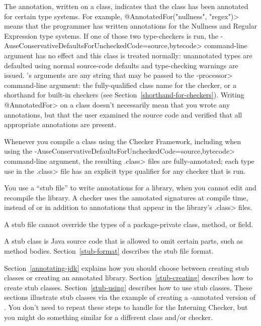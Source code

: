 The  annotation, written on a
class, indicates that the class has been annotated for certain type
systems.  For example, \<@AnnotatedFor(\ttlcb"nullness", "regex"\ttrcb)> means that
the programmer has written annotations for the Nullness and Regular
Expression type systems.  If one of those two type-checkers is run,
the \<-AuseConservativeDefaultsForUncheckedCode=source,bytecode> command-line argument
has no effect and this class is treated normally:
unannotated types are defaulted using normal source-code
defaults and type-checking warnings are issued.
's arguments are any string that
may be passed to the \<-processor> command-line argument:  the
fully-qualified class name for the checker, or a shorthand for built-in
checkers (see Section~\ref{shorthand-for-checkers}).
Writing \<@AnnotatedFor> on a class doesn't necessarily mean that you wrote
any annotations, but that the user examined the source code and verified
that all appropriate annotations are present.

\begin{sloppypar}
Whenever you compile a class using the Checker Framework, including when
using the \<-AuseConservativeDefaultsForUncheckedCode=source,bytecode> command-line
argument, the resulting \<.class> files are fully-annotated; each type use
in the \<.class> file has an explicit type qualifier for any checker that
is run.
\end{sloppypar}



You use a ``stub file'' to write annotations
for a library, when you cannot edit and recompile the library.  A
checker uses the annotated signatures at compile time, instead of or in
addition to annotations that appear in the library's \<.class> files.

A stub file cannot override the types of a package-private class, method, or field.

A stub class is Java source code that is allowed to omit certain parts,
such as method bodies.  Section~\ref{stub-format} describes
the stub file format.

Section~\ref{annotating-jdk} explains how you should choose between
creating stub classes or creating an annotated library.
Section~\ref{stub-creating} describes how to create stub classes.
Section~\ref{stub-using} describes how to use stub classes.
These sections illustrate stub classes via the example of creating a -annotated
version of .  You don't need to repeat these steps
to handle  for the Interning Checker,
but you might do something similar for a different class and/or checker.


